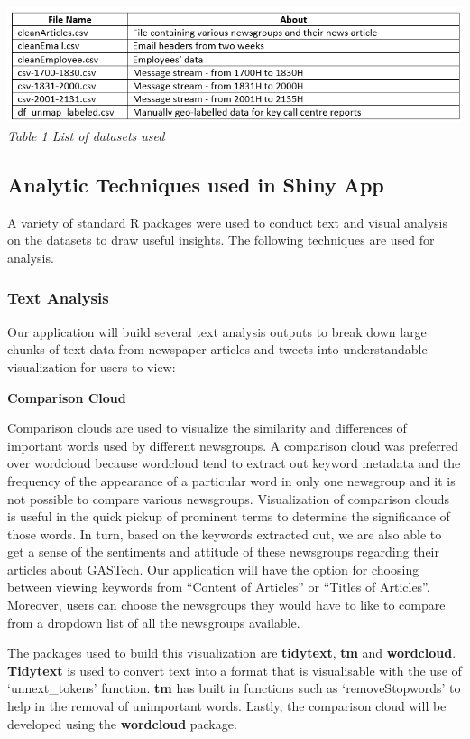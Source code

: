 \documentclass{acm_proc_article-sp}
\begin{document}
\includegraphics{img/table01.png} \emph{Table 1 List of datasets used}

\hypertarget{analytic-techniques-used-in-shiny-app}{%
\subsection{Analytic Techniques used in Shiny
App}\label{analytic-techniques-used-in-shiny-app}}

A variety of standard R packages were used to conduct text and visual
analysis on the datasets to draw useful insights. The following
techniques are used for analysis.

\hypertarget{text-analysis}{%
\subsubsection{Text Analysis}\label{text-analysis}}

Our application will build several text analysis outputs to break down
large chunks of text data from newspaper articles and tweets into
understandable visualization for users to view:

\textbf{Comparison Cloud}

Comparison clouds are used to visualize the similarity and differences
of important words used by different newsgroups. A comparison cloud was
preferred over wordcloud because wordcloud tend to extract out keyword
metadata and the frequency of the appearance of a particular word in
only one newsgroup and it is not possible to compare various newsgroups.
Visualization of comparison clouds is useful in the quick pickup of
prominent terms to determine the significance of those words. In turn,
based on the keywords extracted out, we are also able to get a sense of
the sentiments and attitude of these newsgroups regarding their articles
about GASTech. Our application will have the option for choosing between
viewing keywords from ``Content of Articles'' or ``Titles of Articles''.
Moreover, users can choose the newsgroups they would have to like to
compare from a dropdown list of all the newsgroups available.

The packages used to build this visualization are \textbf{tidytext},
\textbf{tm} and \textbf{wordcloud}. \textbf{Tidytext} is used to convert
text into a format that is visualisable with the use of `unnext\_tokens'
function. \textbf{tm} has built in functions such as `removeStopwords'
to help in the removal of unimportant words. Lastly, the comparison
cloud will be developed using the \textbf{wordcloud} package.
\end{document}
